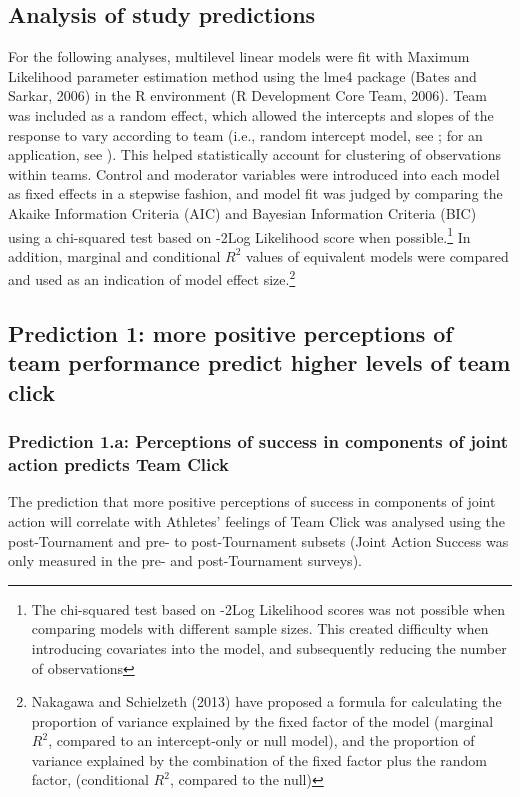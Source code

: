 \begin{landscape}
\section{Analysis of study predictions}
For the following analyses, multilevel linear models were fit with Maximum Likelihood parameter estimation method using the lme4 package (Bates and Sarkar, 2006) in the R environment (R Development Core Team, 2006).  Team was included as a random effect, which allowed the intercepts and slopes of the response to vary according to team (i.e., random intercept model, see \citep{Pinheiro2000}; for an application, see \citep{Oberauer2006}). This helped statistically account for clustering of observations within teams. Control and moderator variables were introduced into each model as fixed effects in a stepwise fashion, and model fit was judged by comparing the Akaike Information Criteria (AIC) and Bayesian Information Criteria (BIC) using a chi-squared test based on -2Log Likelihood score when possible.\footnote{The chi-squared test based on -2Log Likelihood scores was not possible when comparing models with different sample sizes.
This created difficulty when introducing covariates into the model, and subsequently reducing the number of observations} In addition, marginal and conditional $R^2$ values of equivalent models were compared and used as an indication of model effect size.\footnote{Nakagawa and Schielzeth (2013) have proposed a formula for calculating the proportion of variance explained by the fixed factor of the model (marginal $R^2$, compared to an intercept-only or null model), and the proportion of variance explained by the combination of the fixed factor plus the random factor, (conditional $R^2$, compared to the null)}

\subsection{Prediction 1: more positive perceptions of team performance predict higher levels of team click}

\subsubsection{Prediction 1.a: Perceptions of success in components of joint action predicts Team Click}

The prediction that more positive perceptions of success in components of joint action will correlate with Athletes' feelings of Team Click was analysed using the post-Tournament and pre- to post-Tournament subsets (Joint Action Success was only measured in the pre- and post-Tournament surveys).


\end{landscape}
